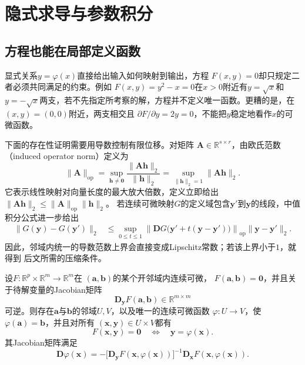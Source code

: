 \section{隐式求导与参数积分}
\label{sec:analysis-implicit-parameter-integral}
\subsection{方程也能在局部定义函数}
显式关系$y=\varphi(x)$直接给出输入如何映射到输出，方程 $F(x,y)=0$却只规定二者必须共同满足的约束。例如 $F(x,y)=y^2-x=0$在$x>0$附近有$y=\sqrt{x}$和$y=-\sqrt{x}$两支，若不先指定所考察的解，方程并不定义唯一函数。更糟的是，在$(x,y)=(0,0)$附近，两支相交且 $\partial F/\partial y=2y=0$，不能把$y$稳定地看作$x$的可微函数。

下面的存在性证明需要用导数控制有限位移。对矩阵
$\bm{A}\in\mathbb{R}^{s\times r}$，由欧氏范数
（induced operator norm）定义为
\[
  \lVert\bm{A}\rVert_{\mathrm{op}}
  =
  \sup_{\bm{h}\neq\bm{0}}
  \frac{\lVert\bm{A}\bm{h}\rVert_2}{\lVert\bm{h}\rVert_2}
  =
  \sup_{\lVert\bm{h}\rVert_2=1}\lVert\bm{A}\bm{h}\rVert_2.
\]
它表示线性映射对向量长度的最大放大倍数，定义立即给出
$\lVert\bm{A}\bm{h}\rVert_2
\leq\lVert\bm{A}\rVert_{\mathrm{op}}\lVert\bm{h}\rVert_2$。
若连续可微映射$G$的定义域包含$\bm{y}'$到$\bm{y}$的线段，中值积分公式进一步给出
\begin{equation}
  \begin{aligned}
  \lVert G(\bm{y})-G(\bm{y}')\rVert_2
  &\leq
  \sup_{0\leq t\leq1}
  \left\lVert
    \bm{D}G\bigl(\bm{y}'+t(\bm{y}-\bm{y}')\bigr)
  \right\rVert_{\mathrm{op}}
  \lVert\bm{y}-\bm{y}'\rVert_2.
  \end{aligned}
\label{eq:analysis-operator-mean-value-bound}
\end{equation}
因此，邻域内统一的导数范数上界会直接变成Lipschitz常数；若该上界小于$1$，就得到
后文所需的压缩条件。
\begin{theorem}[隐函数定理]
\label{thm:analysis-implicit-function}
设$F:\mathbb{R}^p\times\mathbb{R}^m\to\mathbb{R}^m$在 $(\bm{a},\bm{b})$的某个开邻域内连续可微， $F(\bm{a},\bm{b})=\bm{0}$，并且关于待解变量的Jacobian矩阵 \[   \bm{D}_{\bm{y}}F(\bm{a},\bm{b})   \in\mathbb{R}^{m\times m} \]
可逆。则存在$\bm{a}$与$\bm{b}$的邻域$U,V$，以及唯一的连续可微函数
$\varphi:U\to V$，使$\varphi(\bm{a})=\bm{b}$，并且对所有
$(\bm{x},\bm{y})\in U\times V$都有
\[
  F(\bm{x},\bm{y})=\bm{0}
  \quad\Longleftrightarrow\quad
  \bm{y}=\varphi(\bm{x}).
\]
其Jacobian矩阵满足
\begin{equation}
  \bm{D}\varphi(\bm{x})
  =
  -
  \bigl[\bm{D}_{\bm{y}}F(\bm{x},\varphi(\bm{x}))\bigr]^{-1}
  \bm{D}_{\bm{x}}F(\bm{x},\varphi(\bm{x})).
\label{eq:analysis-implicit-derivative}
\end{equation}
\end{theorem}

